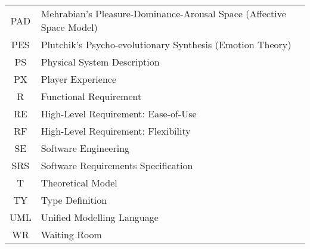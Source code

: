 \begin{center}
\begin{tabular}{c l}
        PAD & Mehrabian's Pleasure-Dominance-Arousal Space (Affective Space
        Model) \\

        \rowcolor[gray]{0.9}PES & Plutchik's Psycho-evolutionary Synthesis
        (Emotion Theory) \\

        PS & Physical System Description \\

        \rowcolor[gray]{0.9}PX & Player Experience \\

        R & Functional Requirement \\

        \rowcolor[gray]{0.9}RE & High-Level Requirement: Ease-of-Use \\

        RF & High-Level Requirement: Flexibility \\

        \rowcolor[gray]{0.9}SE & Software Engineering \\

        SRS & Software Requirements Specification \\

        \rowcolor[gray]{0.9}T & Theoretical Model \\

        TY & Type Definition \\

        \rowcolor[gray]{0.9}UML & Unified Modelling Language \\

        WR & Waiting Room \\

        \bottomrule
    \end{tabular}

\end{center}